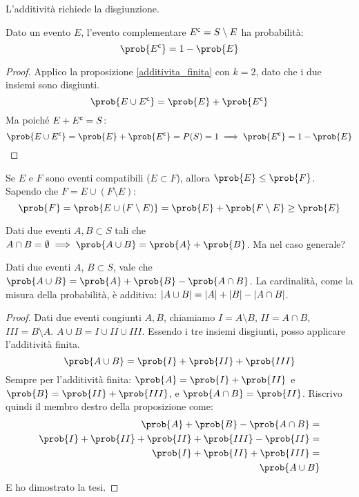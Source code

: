 L'additivit\`a richiede la disgiunzione.

\begin{prop}
Dato un evento $E$, l'evento complementare $E^{\mathsf{c}} = S \setminus E$ ha probabilit\`a:
\[
\prob{E^{\compl}} = 1 - \prob{E}
\]
\end{prop}
\begin{proof}
Applico la proposizione \ref{additivita_finita} con $k = 2$, dato che i due insiemi sono disgiunti.
\[
\prob{E \cup E^{\compl}} = \prob{E} + \prob{E^{\compl}}
\]
Ma poich\'e $E + E^{\mathsf{c}} = S$:
\[
\prob{E \cup E^{\compl}} = \prob{E} + \prob{E^{\compl}} = P(S) = 1 \implies
\prob{E^{\compl}} = 1 - \prob{E}
\]
\end{proof}

\begin{prop}
Se $E$ e $F$ sono eventi compatibili ($E \subset F$), allora $\prob{E} \le \prob{F}$. Sapendo che $F = E \cup (F \setminus E)$:
\[
\prob{F} = \prob{E \cup (F \setminus E)} = \prob{E} + \prob{F \setminus E} \ge \prob{E}
\]
\end{prop}

Dati due eventi $A, B \subset S$ tali che $A \cap B = \emptyset \implies \prob{A \cup B} = \prob{A} + \prob{B}$. Ma nel caso generale?

\begin{prop}
Dati due eventi $A$, $B \subset S$, vale che $\prob{A \cup B} = \prob{A} + \prob{B} - \prob{A \cap B}$. La cardinalit\`a, come la misura della probabilit\`a, \`e additiva: $\left\lvert{A \cup B}\right\rvert = \left\lvert{A}\right\rvert + \left\lvert{B}\right\rvert - \left\lvert{A \cap B}\right\rvert$.
\end{prop}
\begin{proof}
Dati due eventi congiunti $A, B$, chiamiamo $I = A \setminus B$, $II = A \cap B$, $III = B \setminus A$. $A \cup B = I \cup II \cup III$. Essendo i tre insiemi disgiunti, posso applicare l'additivit\`a finita.
\[
\prob{A \cup B} = \prob{I} + \prob{II} + \prob{III}
\]
Sempre per l'additivit\`a finita: $\prob{A} = \prob{I} + \prob{II}$ e $\prob{B} = \prob{II} + \prob{III}$, e $\prob{A \cap B} = \prob{II}$. Riscrivo quindi il membro destro della proposizione come:
\begin{align*}
\prob{A} + \prob{B} - \prob{A \cap B} = \\
\prob{I} + \prob{II} + \prob{II} + \prob{III} - \prob{II} = \\
\prob{I} + \prob{II} + \prob{III} = \\
\prob{A \cup B}
\end{align*}
E ho dimostrato la tesi.
\end{proof}

